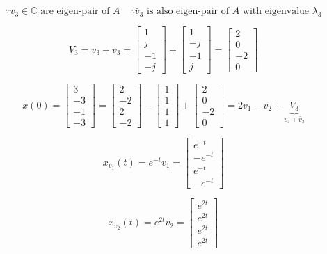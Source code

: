 \documentclass[12pt,a4paper]{article}
\begin{document}
\[
\because v_3 \in \mathbb C \text{ are eigen-pair of } A \quad \therefore \bar v_3 \text{ is also eigen-pair of }A \text{ with eigenvalue } \bar\lambda_3
\]

\[
V_3 = v_3 + \bar v_3 = \begin{bmatrix}
	1 \\ j \\ -1 \\ -j
\end{bmatrix} + \begin{bmatrix}
	1 \\ -j \\ -1 \\ j
\end{bmatrix} = \begin{bmatrix}
2 \\ 0 \\- 2 \\ 0
\end{bmatrix}
\]

\[
x(0) = \begin{bmatrix}
	3 \\ -3 \\ -1 \\ -3
\end{bmatrix} =\begin{bmatrix}
 2 \\ -2 \\ 2 \\ -2
\end{bmatrix} - \begin{bmatrix}
1 \\ 1 \\ 1 \\ 1
\end{bmatrix} + \begin{bmatrix}
2 \\ 0 \\ -2 \\ 0 
\end{bmatrix}= 2v_1 - v_2 + \underbrace{V_3}_{v_3 + \bar v_3}
\]

\[
x_{v_1}(t) = e^{-t}v_1 = \begin{bmatrix}
	e^{-t} \\ -e^{-t} \\ e^{-t} \\ -e^{-t}
\end{bmatrix}
\]

\[
x_{v_2}(t) = e^{2t}v_2 = \begin{bmatrix}
	e^{2t} \\ e^{2t}\\ e^{2t}\\e^{2t}
\end{bmatrix}
\]
\end{document}
